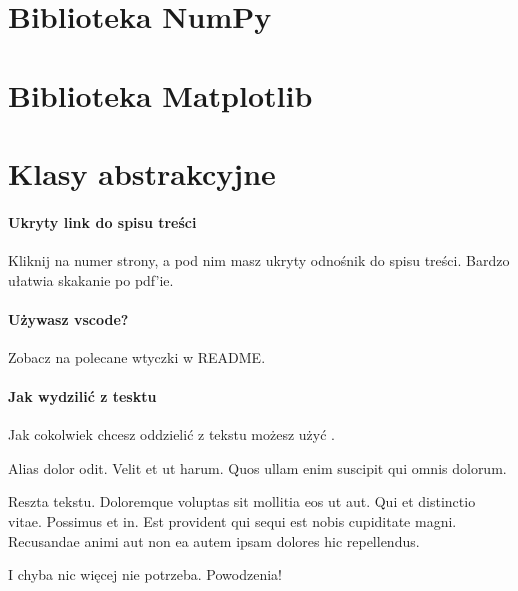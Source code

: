 \section{Biblioteka NumPy}


\section{Biblioteka Matplotlib}


\section{Klasy abstrakcyjne}




\paragraph{Ukryty link do spisu treści}
Kliknij na numer strony, a pod nim masz ukryty odnośnik do spisu treści. Bardzo ułatwia skakanie po pdf'ie.

\paragraph{Używasz vscode?}
Zobacz na polecane wtyczki w README.

\paragraph{Jak wydzilić z tesktu}
Jak cokolwiek chcesz oddzielić z tekstu możesz użyć .

\begin{onepage}[1cm]
    \centering
    Alias dolor odit. Velit et ut harum. Quos ullam enim suscipit qui omnis dolorum.
\end{onepage}

Reszta tekstu.
Doloremque voluptas sit mollitia eos ut aut. Qui et distinctio vitae. Possimus et in. Est provident qui sequi est nobis cupiditate magni. Recusandae animi aut non ea autem ipsam dolores hic repellendus.

I chyba nic więcej nie potrzeba. Powodzenia!
